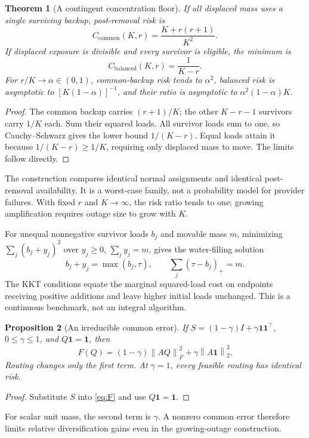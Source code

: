 \documentclass[11pt]{article}
\newtheorem{theorem}{Theorem}
\newtheorem{proposition}[theorem]{Proposition}
\newcommand{\one}{\mathbf{1}}
\newcommand{\norm}[1]{\left\lVert#1\right\rVert}
\begin{document}
\begin{theorem}[A contingent concentration floor]\label{thm:floor}
If all displaced mass uses a single surviving backup, post-removal risk is
\begin{equation}
 C_{\mathrm{common}}(K,r)=\frac{K+r(r+1)}{K^2}.
 \label{eq:common}
\end{equation}
If displaced exposure is divisible and every survivor is eligible, the minimum is
\begin{equation}
 C_{\mathrm{balanced}}(K,r)=\frac1{K-r}.
 \label{eq:balanced}
\end{equation}
For \(r/K\to\alpha\in(0,1)\), common-backup risk tends to \(\alpha^2\), balanced risk is asymptotic to \([K(1-\alpha)]^{-1}\), and their ratio is asymptotic to \(\alpha^2(1-\alpha)K\).
\end{theorem}
\begin{proof}
The common backup carries \((r+1)/K\); the other \(K-r-1\) survivors carry \(1/K\) each. Sum their squared loads. All survivor loads sum to one, so Cauchy--Schwarz gives the lower bound \(1/(K-r)\). Equal loads attain it because \(1/(K-r)\ge1/K\), requiring only displaced mass to move. The limits follow directly.
\end{proof}
The construction compares identical normal assignments and identical post-removal availability. It is a worst-case family, not a probability model for provider failures. With fixed \(r\) and \(K\to\infty\), the risk ratio tends to one; growing amplification requires outage size to grow with \(K\).

For unequal nonnegative survivor loads \(b_j\) and movable mass \(m\), minimizing \(\sum_j(b_j+y_j)^2\) over \(y_j\ge0\), \(\sum_jy_j=m\), gives the water-filling solution
\begin{equation}
 b_j+y_j=\max(b_j,\tau),\qquad \sum_j(\tau-b_j)_+=m.
 \label{eq:waterfill}
\end{equation}
The KKT conditions equate the marginal squared-load cost on endpoints receiving positive additions and leave higher initial loads unchanged. This is a continuous benchmark, not an integral algorithm.

\begin{proposition}[An irreducible common error]\label{prop:commonerror}
If \(S=(1-\gamma)I+\gamma\one\one^\top\), \(0\le\gamma\le1\), and \(Q\one=\one\), then
\begin{equation}
 F(Q)=(1-\gamma)\norm{AQ}_F^2+\gamma\norm{A\one}_2^2.
 \label{eq:equicorr}
\end{equation}
Routing changes only the first term. At \(\gamma=1\), every feasible routing has identical risk.
\end{proposition}
\begin{proof}
Substitute \(S\) into \eqref{eq:F} and use \(Q\one=\one\).
\end{proof}
For scalar unit mass, the second term is \(\gamma\). A nonzero common error therefore limits relative diversification gains even in the growing-outage construction.
\end{document}
